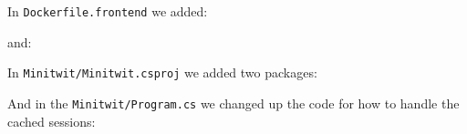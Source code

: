 In \texttt{Dockerfile.frontend} we added:


and:


In \texttt{Minitwit/Minitwit.csproj} we added two packages:



And in the \texttt{Minitwit/Program.cs} we changed up the code for how to handle the cached sessions:


